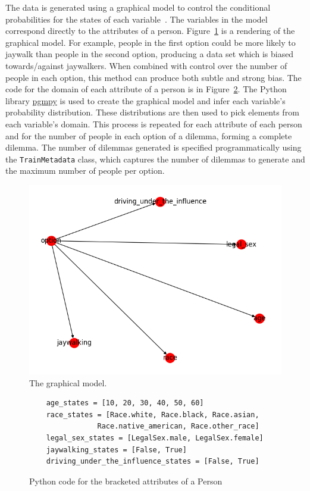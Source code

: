 \documentclass[paper=a4paper]{report}
\newcommand{\code}{\texttt}
\begin{document}
The data is generated using a graphical model to control the conditional probabilities for the
states of each variable~\cite{blei2003latent}. The variables in the model correspond directly to the
attributes of a person. Figure~\ref{fig:graphical_model_image} is a rendering of the graphical
model. For example, people in the first option could be more likely to jaywalk than people in the
second option, producing a data set which is biased towards/against jaywalkers. When combined with
control over the number of people in each option, this method can produce both subtle and strong
bias. The code for the domain of each attribute of a person is in
Figure~\ref{fig:code_for_person_attribute_domains}. The Python library
\href{https://github.com/pgmpy/pgmpy}{pgmpy} is used to create the graphical model and infer each
variable’s probability distribution. These distributions are then used to pick elements from each
variable’s domain. This process is repeated for each attribute of each person and for the number of
people in each option of a dilemma, forming a complete dilemma. The number of dilemmas generated is
specified programmatically using the \code{TrainMetadata} class, which captures the number of
dilemmas to generate and the maximum number of people per option.

\begin{figure}[h]
    \centering
    \includegraphics[scale=0.6]{figures/network.png}
    \caption[]{The graphical model.}
    \label{fig:graphical_model_image}
\end{figure}

\begin{figure}[h]
    \centering
    \begin{verbatim}
    age_states = [10, 20, 30, 40, 50, 60]
    race_states = [Race.white, Race.black, Race.asian,
                Race.native_american, Race.other_race]
    legal_sex_states = [LegalSex.male, LegalSex.female]
    jaywalking_states = [False, True]
    driving_under_the_influence_states = [False, True]
    \end{verbatim}
    \caption{Python code for the bracketed attributes of a Person}
    \label{fig:code_for_person_attribute_domains}
\end{figure}
\end{document}
